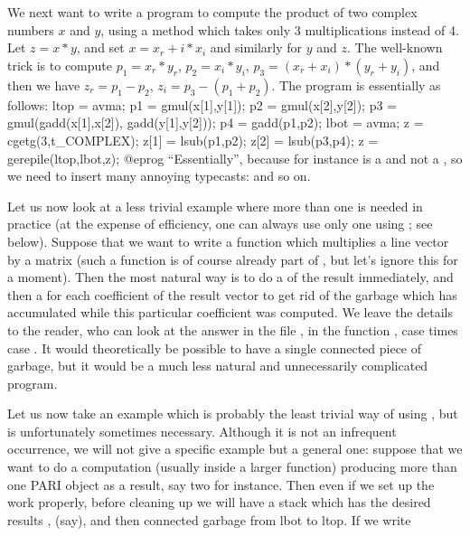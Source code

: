 We next want to write a program to compute the product of two complex numbers
$x$ and $y$, using a method which takes only 3 multiplications instead of 4.
Let $z = x*y$, and set $x = x_r + i*x_i$ and similarly for $y$ and $z$. The
well-known trick is to compute $p_1 = x_r*y_r$, $p_2=x_i*y_i$,
$p_3=(x_r+x_i)*(y_r+y_i)$, and then we have $z_r=p_1-p_2$,
$z_i=p_3-(p_1+p_2)$. The program is essentially as follows:
%
\bprog
ltop = avma;
p1 = gmul(x[1],y[1]);
p2 = gmul(x[2],y[2]);
p3 = gmul(gadd(x[1],x[2]), gadd(y[1],y[2]));
p4 = gadd(p1,p2); lbot = avma;
z = cgetg(3,t_COMPLEX);
z[1] = lsub(p1,p2);
z[2] = lsub(p3,p4);
z = gerepile(ltop,lbot,z);
@eprog
\noindent
``Essentially'', because for instance  is a  and not a
, so we need to insert many annoying typecasts:
 and so on.

Let us now look at a less trivial example where more than one 
is needed in practice (at the expense of efficiency, one can always use only
one using ; see below). Suppose that we want to write a function
which multiplies a line vector by a matrix (such a function is of course
already part of , but let's ignore this for a moment). Then the
most natural way is to do a  of the result immediately, and then a
 for each coefficient of the result vector to get rid of the
garbage which has accumulated while this particular coefficient was computed.
We leave the details to the reader, who can look at the answer in the file
, in the function , case  times case
. It would theoretically be possible to have a single connected
piece of garbage, but it would be a much less natural and unnecessarily
complicated program.

Let us now take an example which is probably the least trivial way of using
, but is unfortunately sometimes necessary. Although it is not
an infrequent occurrence, we will not give a specific example but a general
one: suppose that we want to do a computation (usually inside a larger
function) producing more than one PARI object as a result, say two for
instance. Then even if we set up the work properly, before cleaning up we
will have a stack which has the desired results ,  (say),
and then connected garbage from lbot to ltop. If we write


